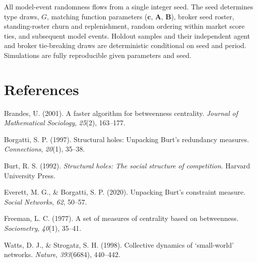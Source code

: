 \documentclass[11pt]{article}
\begin{document}
All model-event randomness flows from a single integer seed. The seed determines type draws, \(G\), matching function parameters (\(\mathbf{c}\), \(\mathbf{A}\), \(\mathbf{B}\)), broker seed roster, standing-roster churn and replenishment, random ordering within market score ties, and subsequent model events. Holdout samples and their independent agent and broker tie-breaking draws are deterministic conditional on seed and period. Simulations are fully reproducible given parameters and seed.

\section{References}\label{references}

Brandes, U. (2001). A faster algorithm for betweenness centrality. \emph{Journal of Mathematical Sociology}, \emph{25}(2), 163--177.

Borgatti, S. P. (1997). Structural holes: Unpacking Burt's redundancy measures. \emph{Connections}, \emph{20}(1), 35--38.

Burt, R. S. (1992). \emph{Structural holes: The social structure of competition}. Harvard University Press.

Everett, M. G., \& Borgatti, S. P. (2020). Unpacking Burt's constraint measure. \emph{Social Networks}, \emph{62}, 50--57.

Freeman, L. C. (1977). A set of measures of centrality based on betweenness. \emph{Sociometry}, \emph{40}(1), 35--41.

Watts, D. J., \& Strogatz, S. H. (1998). Collective dynamics of `small-world' networks. \emph{Nature}, \emph{393}(6684), 440--442.
\end{document}
